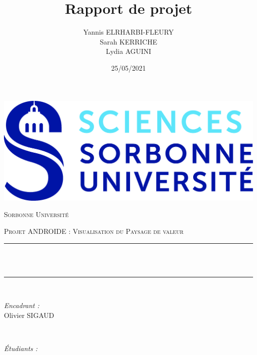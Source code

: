 \documentclass[12pt]{article}
\title{Rapport de projet}
\author{
Yannis ELRHARBI-FLEURY \\
Sarah KERRICHE \\
Lydia AGUINI
}
\date{25/05/2021}
\makeatletter
\let\thetitle\@title
\let\theauthor\@author
\makeatother
\begin{document}


\begin{titlepage}
	\centering
    \vspace*{0.5 cm}
   \includegraphics[scale = 0.075]{Images/logo_SU.jpeg}\\[1.0 cm]	%
\begin{center}    \textsc{\Large   Sorbonne Université}\\[2.0 cm]	\end{center}%
	\textsc{\Large Projet ANDROIDE : Visualisation du Paysage de valeur}\\[0.5 cm]				%
	\rule{\linewidth}{0.2 mm} \\[0.4 cm]
	{ \huge \bfseries \thetitle}\\
	\rule{\linewidth}{0.2 mm} \\[1.5 cm]
	
	\begin{minipage}{0.4\textwidth}
		\begin{flushleft} \large
		\emph{Encadrant :}\\
		Olivier SIGAUD\\
		\textbf{\Large }
			\end{flushleft}
			\end{minipage}~
			\begin{minipage}{0.4\textwidth}
            
			\begin{flushright} \large
			\emph{Étudiants :}\\
			\theauthor
		\end{flushright}
           
	\end{minipage}\\[2 cm]
	
\end{titlepage}
\end{document}
